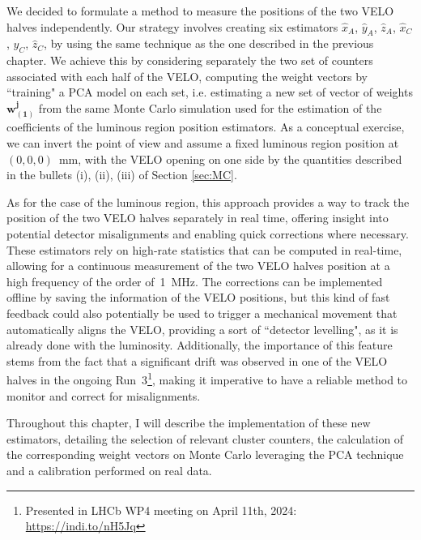 We decided to formulate a method to measure the positions of the two VELO halves independently. 
Our strategy involves creating six estimators $\hat{x}_A$, $\hat{y}_A$, $\hat{z}_A$, $\hat{x}_C$, $\hat{y}_C$, $\hat{z}_C$, by using the same technique as the one described in the previous chapter. 
We achieve this by considering separately the two set of counters associated with each half of the VELO, computing the weight vectors by ``training" a PCA model on each set, i.e. estimating a new set of vector of weights $\mathbf{w^j_{(1)}}$ from the same Monte Carlo simulation used for the estimation of the coefficients of the luminous region position estimators.
As a conceptual exercise, we can invert the point of view and assume a fixed luminous region position at $(0,0,0)$~mm, with the VELO opening on one side by the quantities described in the bullets (i), (ii), (iii) of Section \ref{sec:MC}. 


As for the case of the luminous region, this approach provides a way to track the position of the two VELO halves separately in real time, offering insight into potential detector misalignments and enabling quick corrections where necessary. These estimators rely on high-rate statistics that can be computed in real-time, allowing for a continuous measurement of the two VELO halves position at a high frequency of the order of~\SI{1}{\mega\hertz}. The corrections can be implemented offline by saving the information of the VELO positions, but this kind of fast feedback could also potentially be used to trigger a mechanical movement that automatically aligns the VELO, providing a sort of ``detector levelling", as it is already done with the luminosity. Additionally, the importance of this feature stems from the fact that a significant drift was observed in one of the VELO halves in the ongoing Run~3\footnote{Presented in LHCb WP4 meeting on April 11th, 2024: \url{https://indi.to/nH5Jq}}, making it imperative to have a reliable method to monitor and correct for misalignments.

Throughout this chapter, I will describe the implementation of these new estimators, detailing the selection of relevant cluster counters, the calculation of the corresponding weight vectors on Monte Carlo leveraging the PCA technique and a calibration performed on real data.



